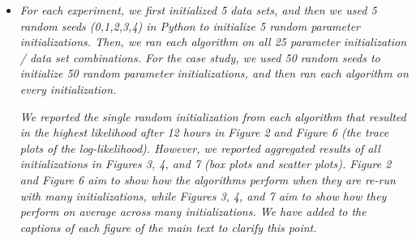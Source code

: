 \documentclass[11pt]{article}
\begin{document}
\begin{itemize}
    \item \textit{For each experiment, we first initialized 5 data sets, and then we used 5 random seeds (0,1,2,3,4) in Python to initialize 5 random parameter initializations. Then, we ran each algorithm on all 25 parameter initialization / data set combinations. For the case study, we used 50 random seeds to initialize 50 random parameter initializations, and then ran each algorithm on every initialization.}
    
    \textit{We reported the single random initialization from each algorithm that resulted in the highest likelihood after 12 hours in Figure 2 and Figure 6 (the trace plots of the log-likelihood). However, we reported aggregated results of all initializations in Figures 3, 4, and 7 (box plots and scatter plots). Figure 2 and Figure 6 aim to show how the algorithms perform when they are re-run with many initializations, while Figures 3, 4, and 7 aim to show how they perform on average across many initializations. We have added to the captions of each figure of the main text to clarify this point.}
\end{itemize} 
\end{document}
